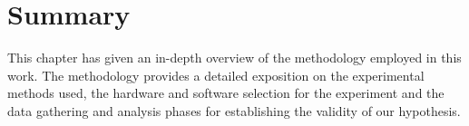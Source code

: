 

\section{Summary}
This chapter has given an in-depth overview of the methodology employed in this work. The methodology provides a detailed exposition on the experimental methods used, the hardware and software selection for the experiment and the data gathering and analysis phases for establishing the validity of our hypothesis.